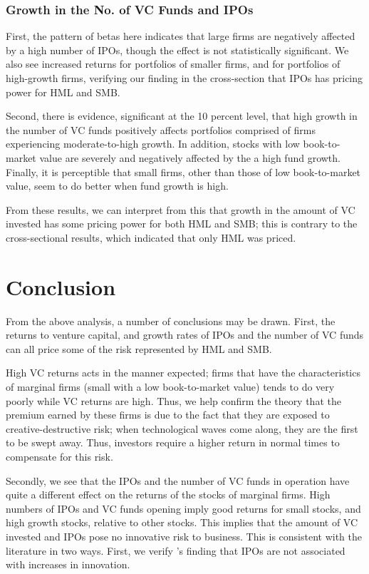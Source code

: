 \documentclass[12pt]{article}
\begin{document}
	\subsubsection{Growth in the No. of VC Funds and IPOs}

	First, the pattern of betas here indicates that large firms are negatively affected by a high number of IPOs, though the effect is not statistically significant. We also see increased returns for portfolios of smaller firms, and for portfolios of high-growth firms, verifying our finding in the cross-section that IPOs has pricing power for HML and SMB.

Second, there is evidence, significant at the 10 percent level, that high growth in the number of VC funds positively affects portfolios comprised of firms experiencing moderate-to-high growth. In addition, stocks with low book-to-market value are severely and negatively affected by the a high fund growth. Finally, it is perceptible that small firms, other than those of low book-to-market value, seem to do better when fund growth is high. 

From these results, we can interpret from this that growth in the amount of VC invested has some pricing power for both HML and SMB; this is contrary to the cross-sectional results, which indicated that only HML was priced.
	

\section{Conclusion}

From the above analysis, a number of conclusions may be drawn. First, the returns to venture capital, and growth rates of IPOs and the number of VC funds can all price some of the risk represented by HML and SMB.

High VC returns acts in the manner expected; firms that have the characteristics of marginal firms (small with a low book-to-market value) tends to do very poorly while VC returns are high. Thus, we help confirm the theory that the premium earned by these firms is due to the fact that they are exposed to creative-destructive risk; when technological waves come along, they are the first to be swept away. Thus, investors require a higher return in normal times to compensate for this risk.

Secondly, we see that the IPOs and the number of VC funds in operation have quite a different effect on the returns of the stocks of marginal firms. High numbers of IPOs and VC funds opening imply good returns for small stocks, and high growth stocks, relative to other stocks. This implies that the amount of VC invested and IPOs pose no innovative risk to business. This is consistent with the literature in two ways. First, we verify \cite{bernstein}'s finding that IPOs are not associated with increases in innovation. 
\end{document}
